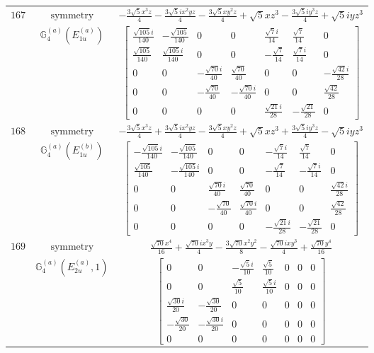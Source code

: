 \documentclass[fleqn,8pt,landscape]{jsarticle}
\begin{document}
\begin{longtable}{ccc}
$ 167 $ & $ \text{symmetry} $ & $ - \frac{3 \sqrt{5} x^{3} z}{4} - \frac{3 \sqrt{5} i x^{2} y z}{4} - \frac{3 \sqrt{5} x y^{2} z}{4} + \sqrt{5} x z^{3} - \frac{3 \sqrt{5} i y^{3} z}{4} + \sqrt{5} i y z^{3} $ \\
$  $ & $ \mathbb{G}_{4}^{(a)}(E_{1u}^{(a)}) $ & $ \begin{bmatrix} \frac{\sqrt{105} i}{140} & - \frac{\sqrt{105}}{140} & 0 & 0 & \frac{\sqrt{7} i}{14} & \frac{\sqrt{7}}{14} & 0 \\ \frac{\sqrt{105}}{140} & \frac{\sqrt{105} i}{140} & 0 & 0 & - \frac{\sqrt{7}}{14} & \frac{\sqrt{7} i}{14} & 0 \\ 0 & 0 & - \frac{\sqrt{70} i}{40} & \frac{\sqrt{70}}{40} & 0 & 0 & - \frac{\sqrt{42} i}{28} \\ 0 & 0 & - \frac{\sqrt{70}}{40} & - \frac{\sqrt{70} i}{40} & 0 & 0 & \frac{\sqrt{42}}{28} \\ 0 & 0 & 0 & 0 & \frac{\sqrt{21} i}{28} & - \frac{\sqrt{21}}{28} & 0 \end{bmatrix} $ \\ \hline
$ 168 $ & $ \text{symmetry} $ & $ - \frac{3 \sqrt{5} x^{3} z}{4} + \frac{3 \sqrt{5} i x^{2} y z}{4} - \frac{3 \sqrt{5} x y^{2} z}{4} + \sqrt{5} x z^{3} + \frac{3 \sqrt{5} i y^{3} z}{4} - \sqrt{5} i y z^{3} $ \\
$  $ & $ \mathbb{G}_{4}^{(a)}(E_{1u}^{(b)}) $ & $ \begin{bmatrix} - \frac{\sqrt{105} i}{140} & - \frac{\sqrt{105}}{140} & 0 & 0 & - \frac{\sqrt{7} i}{14} & \frac{\sqrt{7}}{14} & 0 \\ \frac{\sqrt{105}}{140} & - \frac{\sqrt{105} i}{140} & 0 & 0 & - \frac{\sqrt{7}}{14} & - \frac{\sqrt{7} i}{14} & 0 \\ 0 & 0 & \frac{\sqrt{70} i}{40} & \frac{\sqrt{70}}{40} & 0 & 0 & \frac{\sqrt{42} i}{28} \\ 0 & 0 & - \frac{\sqrt{70}}{40} & \frac{\sqrt{70} i}{40} & 0 & 0 & \frac{\sqrt{42}}{28} \\ 0 & 0 & 0 & 0 & - \frac{\sqrt{21} i}{28} & - \frac{\sqrt{21}}{28} & 0 \end{bmatrix} $ \\ \hline
$ 169 $ & $ \text{symmetry} $ & $ \frac{\sqrt{70} x^{4}}{16} + \frac{\sqrt{70} i x^{3} y}{4} - \frac{3 \sqrt{70} x^{2} y^{2}}{8} - \frac{\sqrt{70} i x y^{3}}{4} + \frac{\sqrt{70} y^{4}}{16} $ \\
$  $ & $ \mathbb{G}_{4}^{(a)}(E_{2u}^{(a)},1) $ & $ \begin{bmatrix} 0 & 0 & - \frac{\sqrt{5} i}{10} & \frac{\sqrt{5}}{10} & 0 & 0 & 0 \\ 0 & 0 & \frac{\sqrt{5}}{10} & \frac{\sqrt{5} i}{10} & 0 & 0 & 0 \\ \frac{\sqrt{30} i}{20} & - \frac{\sqrt{30}}{20} & 0 & 0 & 0 & 0 & 0 \\ - \frac{\sqrt{30}}{20} & - \frac{\sqrt{30} i}{20} & 0 & 0 & 0 & 0 & 0 \\ 0 & 0 & 0 & 0 & 0 & 0 & 0 \end{bmatrix} $ \\ \hline

\end{longtable}
\end{document}

